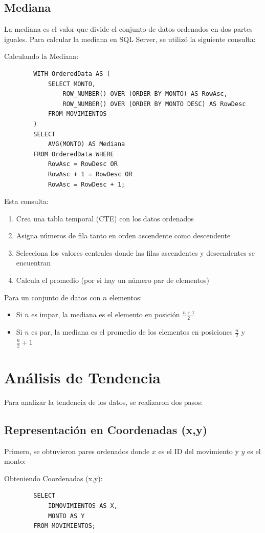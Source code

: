 \subsection{Mediana}
La mediana es el valor que divide el conjunto de datos ordenados en dos partes iguales. Para calcular la mediana en SQL Server, se utilizó la siguiente consulta:
\begin{comando}{Calculando la Mediana:}
	\begin{verbatim}
		WITH OrderedData AS (
			SELECT MONTO,
				ROW_NUMBER() OVER (ORDER BY MONTO) AS RowAsc,
				ROW_NUMBER() OVER (ORDER BY MONTO DESC) AS RowDesc
			FROM MOVIMIENTOS
		)
		SELECT
			AVG(MONTO) AS Mediana
		FROM OrderedData WHERE 
			RowAsc = RowDesc OR 
			RowAsc + 1 = RowDesc OR 
			RowAsc = RowDesc + 1;
	\end{verbatim}
\end{comando}
Esta consulta:
\begin{enumerate}
	\item Crea una tabla temporal (CTE) con los datos ordenados
	\item Asigna números de fila tanto en orden ascendente como descendente
	\item Selecciona los valores centrales donde las filas ascendentes y descendentes se encuentran
	\item Calcula el promedio (por si hay un número par de elementos)
\end{enumerate}
Para un conjunto de datos con $n$ elementos:
\begin{itemize}
	\item Si $n$ es impar, la mediana es el elemento en posición $\frac{n+1}{2}$
	\item Si $n$ es par, la mediana es el promedio de los elementos en posiciones $\frac{n}{2}$ y $\frac{n}{2}+1$
\end{itemize}
\section{Análisis de Tendencia}
Para analizar la tendencia de los datos, se realizaron dos pasos:
\subsection{Representación en Coordenadas (x,y)}
Primero, se obtuvieron pares ordenados donde $x$ es el ID del movimiento y $y$ es el monto:
\begin{comando}{Obteniendo Coordenadas (x,y):}
	\begin{verbatim}
		SELECT
			IDMOVIMIENTOS AS X,
			MONTO AS Y
		FROM MOVIMIENTOS;
	\end{verbatim}
\end{comando}
